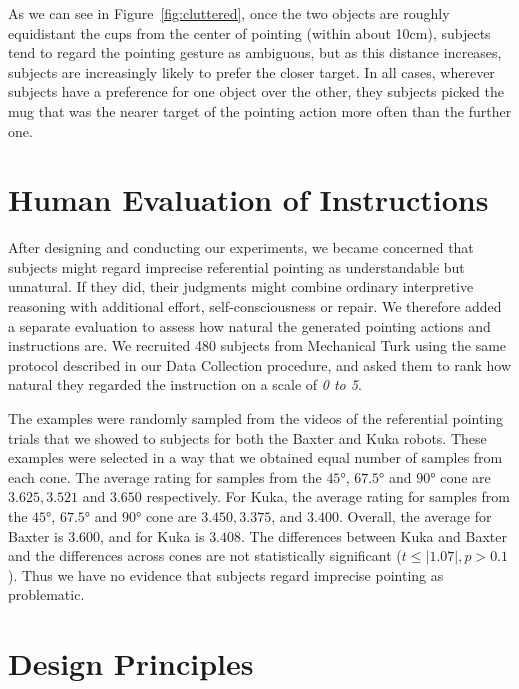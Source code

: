 \documentclass[letterpaper]{article} %
\begin{document}
As we can see in Figure~\ref{fig:cluttered}, once the two objects are roughly equidistant the cups from the center of pointing (within about 10cm), subjects tend to regard the pointing gesture as ambiguous, but as this distance increases, subjects are increasingly likely to prefer the closer target.  In all cases, wherever subjects have a preference for one object over the other, they subjects picked the mug that was the nearer target of the pointing action more often than the further one.




\section{Human Evaluation of Instructions}

After designing and conducting our experiments, we became concerned that subjects might regard imprecise referential pointing as understandable but unnatural.  If they did, their judgments might combine ordinary interpretive reasoning with additional effort, self-consciousness or repair.  We therefore added a separate evaluation to assess how natural the generated pointing actions and instructions are. We recruited 480 subjects from Mechanical Turk using the same protocol described in our Data Collection procedure, and asked them to rank how natural they regarded the instruction on a scale of \textit{0 to 5}. 

The examples were randomly sampled from the videos of the referential pointing trials that we showed to subjects for both the Baxter and Kuka robots. These examples were selected in a way that we obtained equal number of samples from each cone. The average rating for samples from the $\ang{45}$, $\ang{67.5}$ and $\ang{90}$ cone are $3.625, 3.521$
and $3.650$ respectively. For Kuka, the average rating for samples from the $\ang{45}$, $\ang{67.5}$ and $\ang{90}$ cone are $3.450, 3.375$, and $3.400$. Overall, the average for Baxter is $3.600$, and for Kuka is $3.408$. The differences between Kuka and Baxter and the differences across cones are not statistically significant ($t \leq |1.07|, p > 0.1 $).  Thus we have no evidence that subjects regard imprecise pointing as problematic.


\section{Design Principles}
\end{document}

